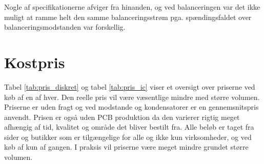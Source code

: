 Nogle af specifikationerne afviger fra hinanden, og ved balanceringen var det ikke muligt at ramme helt den samme balanceringsstrøm pga. spændingsfaldet over balanceringsmodstanden var forskellig. 

\section{Kostpris} \label{sec:sammenligning_kostpris}

Tabel \ref{tab:pris_diskret} og tabel \ref{tab:pris_ic} viser et oversigt over priserne ved køb af en af hver. Den reelle pris vil være væsentlige mindre med større volumen. Priserne er uden fragt og ved modstande og kondensatorer er en gennemsnitspris anvendt. Prisen er også uden PCB produktion da den varierer rigtig meget afhængig af tid, kvalitet og område det bliver bestilt fra. Alle beløb er taget fra sider og butikker som er tilgængelige for alle og ikke kun virksomheder, og ved køb af kun af gangen. I praksis vil priserne være meget mindre grundet større volumen.

